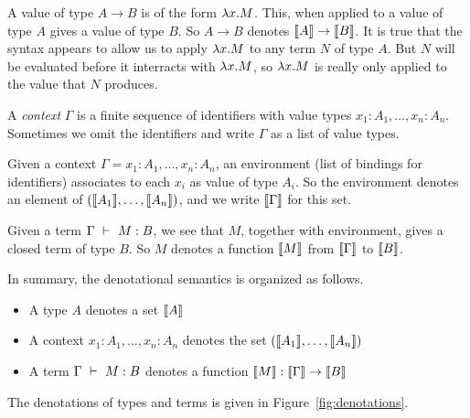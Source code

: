 A value of type $A \to B$ is of the form $\lambda x.M$. This, when
applied to a value of type $A$ gives a value of type $B$. So $A \to B$
denotes $\llbracket A\rrbracket \to \llbracket B\rrbracket$. It is true that the syntax appears to
allow us to apply $\lambda x.M$ to any term $N$ of type $A$. But $N$ will be
evaluated before it interracts with $\lambda x.M$, so $\lambda x.M$ is really only applied to the value that $N$ produces.

\begin{definition}
 A \emph{context} $\Gamma$ is a finite sequence of identifiers with value
 types $x_1:A_1, \dots ,x_n:A_n$. Sometimes we omit the identifiers and
 write $\Gamma$ as a list of value types.
\end{definition}

Given a context $\Gamma = x_1:A_1,\dots,x_n:A_n$, an environment (list of
bindings for identifiers) associates to each $x_i$ as value of type $A_i$. So
the environment denotes an element of $(\llbracket A_1\rrbracket,\dots,\llbracket A_n\rrbracket)$, and
we write $\llbracket\Gamma\rrbracket$ for this set.

Given a \corelang term $\Gamma~\vdash~M: B$, we see that $M$, together with
environment, gives a closed term of type $B$. So $M$ denotes a function
$\llbracket M\rrbracket$ from $\llbracket\Gamma\rrbracket$ to $\llbracket B\rrbracket$.

In summary, the denotational semantics is organized as follows.

\begin{itemize}
  \item A type $A$ denotes a set $\llbracket A\rrbracket$
  \item A context $x_1:A_1,\dots,x_n:A_n$ denotes the set $(\llbracket A_1\rrbracket,\dots,\llbracket A_n\rrbracket)$
  \item A term $\Gamma~\vdash~M: B$ denotes a function $\llbracket M\rrbracket:
  \llbracket\Gamma\rrbracket \to \llbracket B\rrbracket$
\end{itemize}

The denotations of types and terms is given in Figure~\ref{fig:denotations}.

